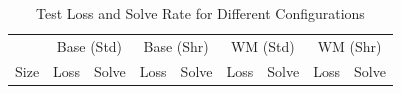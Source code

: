 \begin{table}[t]
\centering
\caption{Test Loss and Solve Rate for Different Configurations}
\begin{tabular}{l|cc|cc|cc|cc}
\hline
& \multicolumn{2}{c|}{Base (Std)} & \multicolumn{2}{c|}{Base (Shr)} & \multicolumn{2}{c|}{WM (Std)} & \multicolumn{2}{c}{WM (Shr)} \\
Size & Loss & Solve & Loss & Solve & Loss & Solve & Loss & Solve \\
\hline
\hline
\end{tabular}
\end{table}
